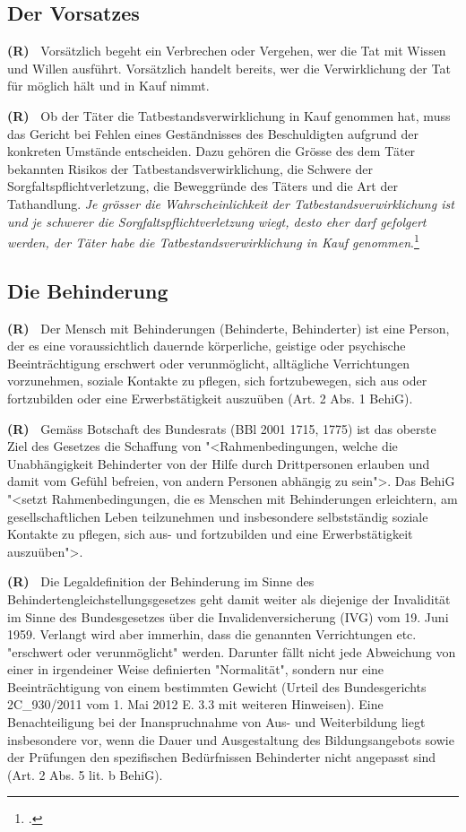 \documentclass[paper=a4,fontsize=12pt, oneside, numbers=noenddot]{scrbook}
\newcounter{rz}
\newcommand{\Rz}{
	\addtocounter{rz}{1}\textbf{(R\arabic{rz})~}
}
\begin{document}
\subsection{Der Vorsatzes}
\Rz Vorsätzlich begeht ein Verbrechen oder Vergehen, wer die Tat mit Wissen und Willen ausführt. Vorsätzlich handelt bereits, wer die Verwirklichung der Tat für möglich hält und in Kauf nimmt.

\Rz Ob der Täter die Tatbestandsverwirklichung in Kauf genommen hat, muss das Gericht bei Fehlen eines Geständnisses des Beschuldigten aufgrund der konkreten Umstände entscheiden. Dazu gehören die Grösse des dem Täter bekannten Risikos der Tatbestandsverwirklichung, die Schwere der Sorgfaltspflichtverletzung, die Beweggründe des Täters und die Art der Tathandlung. \textit{Je grösser die Wahrscheinlichkeit der Tatbestandsverwirklichung ist und je schwerer die Sorgfaltspflichtverletzung wiegt, desto eher darf gefolgert werden, der Täter habe die Tatbestandsverwirklichung in Kauf genommen}.\footcite[Erw. 2.2.1.1 d)]{KGE46018365}

\subsection{Die Behinderung}\label{BehiG}
\Rz Der Mensch mit Behinderungen (Behinderte, Behinderter) ist eine Person, der es eine voraussichtlich dauernde körperliche, geistige oder psychische Beeinträchtigung erschwert oder verunmöglicht, alltägliche Verrichtungen vorzunehmen, soziale Kontakte zu pflegen, sich fortzubewegen, sich aus oder fortzubilden oder eine Erwerbstätigkeit auszuüben (Art. 2 Abs. 1 BehiG). 

\Rz Gemäss Botschaft des Bundesrats (BBl 2001 1715, 1775) ist das oberste Ziel des Gesetzes die Schaffung von "<Rahmenbedingungen, welche die Unabhängigkeit Behinderter von der Hilfe durch Drittpersonen erlauben und damit vom Gefühl befreien, von andern Personen abhängig zu sein">. Das BehiG "<setzt Rahmenbedingungen, die es Menschen mit Behinderungen erleichtern, am gesellschaftlichen Leben teilzunehmen und insbesondere selbstständig soziale Kontakte zu pflegen, sich aus- und fortzubilden und eine Erwerbstätigkeit auszuüben">.

\Rz Die Legaldefinition der Behinderung im Sinne des Behindertengleichstellungsgesetzes geht damit weiter als diejenige der Invalidität im Sinne des Bundesgesetzes über die Invalidenversicherung (IVG) vom 19. Juni 1959. Verlangt wird aber immerhin, dass die genannten Verrichtungen etc. "erschwert oder verunmöglicht" werden. Darunter fällt nicht jede Abweichung von einer in irgendeiner Weise definierten "Normalität", sondern nur eine Beeinträchtigung von einem bestimmten Gewicht (Urteil des Bundesgerichts 2C\_930/2011 vom 1. Mai 2012 E. 3.3 mit weiteren Hinweisen). Eine Benachteiligung bei der Inanspruchnahme von Aus- und Weiterbildung liegt insbesondere vor, wenn die Dauer und Ausgestaltung des Bildungsangebots sowie der Prüfungen den spezifischen Bedürfnissen Behinderter nicht angepasst sind (Art. 2 Abs. 5 lit. b BehiG). 
\end{document}

